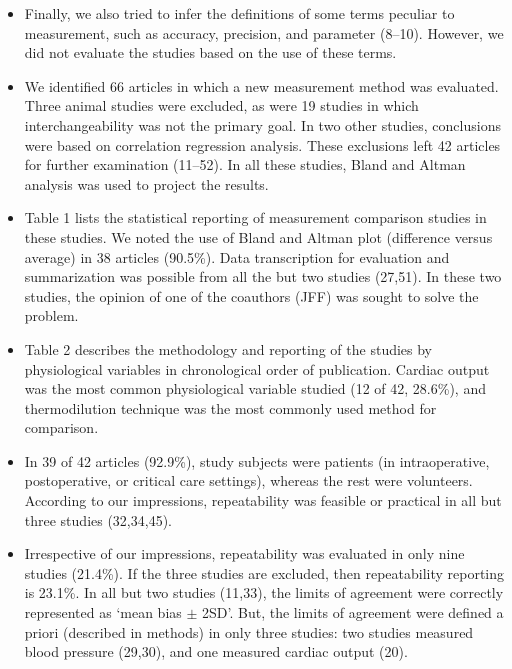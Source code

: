 \documentclass[]{article}
\begin{document}
	\begin{itemize}
	\item Finally, we also tried to infer the definitions of some terms peculiar to measurement, such as accuracy, precision, and parameter (8–10). However, we did not evaluate the studies based on the use of these terms.
	
	\item We identified 66 articles in which a new measurement method was evaluated. Three animal studies were excluded, as were 19 studies in which interchangeability was not the primary goal. In two other studies, conclusions were based on correlation regression analysis. These exclusions left 42 articles for further examination (11–52). In all these studies, Bland and Altman analysis was used to project the results. 
	
	\item Table 1 lists the statistical reporting of measurement comparison studies in these studies. We noted the use of Bland and Altman plot (difference versus average) in 38 articles (90.5\%). Data transcription for evaluation and summarization was possible from all the but two studies (27,51). In these two studies, the opinion of one of the coauthors (JFF) was sought to solve the problem.
	
	
	\item Table 2 describes the methodology and reporting of the studies by physiological variables in chronological order of publication. Cardiac output was the most common physiological variable studied (12 of 42, 28.6\%), and thermodilution technique was the most commonly used method for comparison. 
	\item In 39 of 42 articles (92.9\%), study subjects were patients (in intraoperative, postoperative, or critical care settings), whereas the rest were volunteers. According to our impressions, repeatability was feasible or practical in all but three studies (32,34,45). 
	
	\item Irrespective of our impressions, repeatability was evaluated in only nine studies (21.4\%). If the three studies are excluded, then repeatability reporting is 23.1\%. In all but two studies (11,33), the limits of agreement were correctly represented as ‘mean bias $\pm$ 2SD’. But, the limits of agreement were defined a priori (described in methods) in only three studies: two studies measured blood pressure (29,30), and one measured cardiac output (20). 
	\end{itemize}
\end{document}
